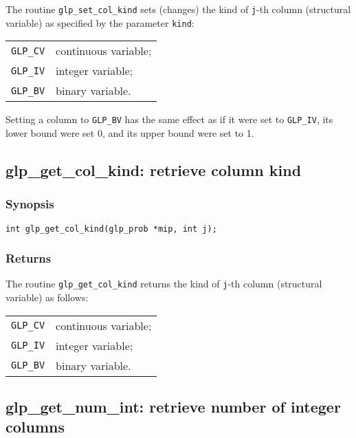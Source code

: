The routine \verb|glp_set_col_kind| sets (changes) the kind of
\verb|j|-th column (structural variable) as specified by the parameter
\verb|kind|:

\begin{tabular}{@{}ll}
\verb|GLP_CV| & continuous variable; \\
\verb|GLP_IV| & integer variable; \\
\verb|GLP_BV| & binary variable. \\
\end{tabular}


Setting a column to \verb|GLP_BV| has the same effect as if it were
set to \verb|GLP_IV|, its lower bound were set 0, and its upper bound
were set to 1.

\subsection{glp\_get\_col\_kind: retrieve column kind}

\subsubsection*{Synopsis}

\begin{verbatim}
int glp_get_col_kind(glp_prob *mip, int j);
\end{verbatim}

\subsubsection*{Returns}

The routine \verb|glp_get_col_kind| returns the kind of \verb|j|-th
column (structural variable) as follows:

\begin{tabular}{@{}ll}
\verb|GLP_CV| & continuous variable; \\
\verb|GLP_IV| & integer variable; \\
\verb|GLP_BV| & binary variable. \\
\end{tabular}

\subsection{glp\_get\_num\_int: retrieve number of integer columns}

